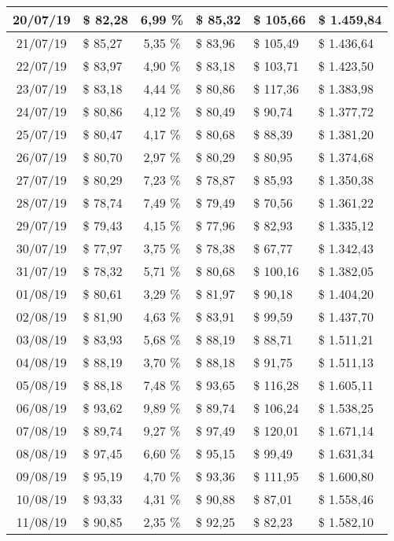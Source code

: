 \begin{center}
\begin{small}
\begin{longtable}{|c|l|c|l|l|l|}
20/07/19 & \$ 82,28 & 6,99 \% & \$ 85,32 & \$ 105,66 & \$ 1.459,84 \\ \hline
21/07/19 & \$ 85,27 & 5,35 \% & \$ 83,96 & \$ 105,49 & \$ 1.436,64 \\ \hline
22/07/19 & \$ 83,97 & 4,90 \% & \$ 83,18 & \$ 103,71 & \$ 1.423,50 \\ \hline
23/07/19 & \$ 83,18 & 4,44 \% & \$ 80,86 & \$ 117,36 & \$ 1.383,98 \\ \hline
24/07/19 & \$ 80,86 & 4,12 \% & \$ 80,49 & \$ 90,74 & \$ 1.377,72 \\ \hline
25/07/19 & \$ 80,47 & 4,17 \% & \$ 80,68 & \$ 88,39 & \$ 1.381,20 \\ \hline
26/07/19 & \$ 80,70 & 2,97 \% & \$ 80,29 & \$ 80,95 & \$ 1.374,68 \\ \hline
27/07/19 & \$ 80,29 & 7,23 \% & \$ 78,87 & \$ 85,93 & \$ 1.350,38 \\ \hline
28/07/19 & \$ 78,74 & 7,49 \% & \$ 79,49 & \$ 70,56 & \$ 1.361,22 \\ \hline
29/07/19 & \$ 79,43 & 4,15 \% & \$ 77,96 & \$ 82,93 & \$ 1.335,12 \\ \hline
30/07/19 & \$ 77,97 & 3,75 \% & \$ 78,38 & \$ 67,77 & \$ 1.342,43 \\ \hline
31/07/19 & \$ 78,32 & 5,71 \% & \$ 80,68 & \$ 100,16 & \$ 1.382,05 \\ \hline
01/08/19 & \$ 80,61 & 3,29 \% & \$ 81,97 & \$ 90,18 & \$ 1.404,20 \\ \hline
02/08/19 & \$ 81,90 & 4,63 \% & \$ 83,91 & \$ 99,59 & \$ 1.437,70 \\ \hline
03/08/19 & \$ 83,93 & 5,68 \% & \$ 88,19 & \$ 88,71 & \$ 1.511,21 \\ \hline
04/08/19 & \$ 88,19 & 3,70 \% & \$ 88,18 & \$ 91,75 & \$ 1.511,13 \\ \hline
05/08/19 & \$ 88,18 & 7,48 \% & \$ 93,65 & \$ 116,28 & \$ 1.605,11 \\ \hline
06/08/19 & \$ 93,62 & 9,89 \% & \$ 89,74 & \$ 106,24 & \$ 1.538,25 \\ \hline
07/08/19 & \$ 89,74 & 9,27 \% & \$ 97,49 & \$ 120,01 & \$ 1.671,14 \\ \hline
08/08/19 & \$ 97,45 & 6,60 \% & \$ 95,15 & \$ 99,49 & \$ 1.631,34 \\ \hline
09/08/19 & \$ 95,19 & 4,70 \% & \$ 93,36 & \$ 111,95 & \$ 1.600,80 \\ \hline
10/08/19 & \$ 93,33 & 4,31 \% & \$ 90,88 & \$ 87,01 & \$ 1.558,46 \\ \hline
11/08/19 & \$ 90,85 & 2,35 \% & \$ 92,25 & \$ 82,23 & \$ 1.582,10 \\ \hline

\end{longtable}
\end{small}
\end{center}
